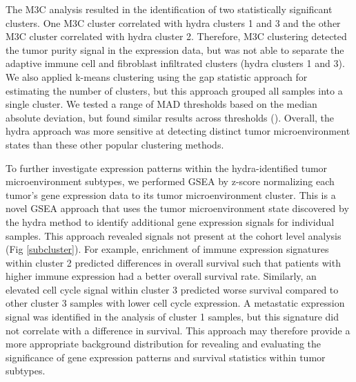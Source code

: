 \documentclass[10pt,letterpaper]{article}
\begin{document}
The M3C analysis resulted in the identification of two statistically significant clusters. One M3C cluster correlated with hydra clusters 1 and 3 and the other M3C cluster correlated with hydra cluster 2. Therefore, M3C clustering detected the tumor purity signal in the expression data, but was not able to separate the adaptive immune cell and fibroblast infiltrated clusters (hydra clusters 1 and 3). We also applied k-means clustering using the gap statistic approach \cite{tibshirani2001estimating,maechler2012cluster} for estimating the number of clusters, but this approach grouped all samples into a single cluster. We tested a range of MAD thresholds based on the median absolute deviation, but found similar results across thresholds (). Overall, the hydra approach was more sensitive at detecting distinct tumor microenvironment states than these other popular clustering methods.

To further investigate expression patterns within the hydra-identified tumor microenvironment subtypes, we performed GSEA by z-score normalizing each tumor’s gene expression data to its tumor microenvironment cluster. This is a novel GSEA approach that uses the tumor microenvironment state discovered by the hydra method to identify additional gene expression signals for individual samples. This approach revealed signals not present at the cohort level analysis (Fig \ref{subcluster}). For example, enrichment of immune expression signatures within cluster 2 predicted differences in overall survival such that patients with higher immune expression had a better overall survival rate. Similarly, an elevated cell cycle signal within cluster 3 predicted worse survival compared to other cluster 3 samples with lower cell cycle expression. A metastatic expression signal was identified in the analysis of cluster 1 samples, but this signature did not correlate with a difference in survival. This approach may therefore provide a more appropriate background distribution for revealing and evaluating the significance of gene expression patterns and survival statistics within tumor subtypes.
\end{document}
